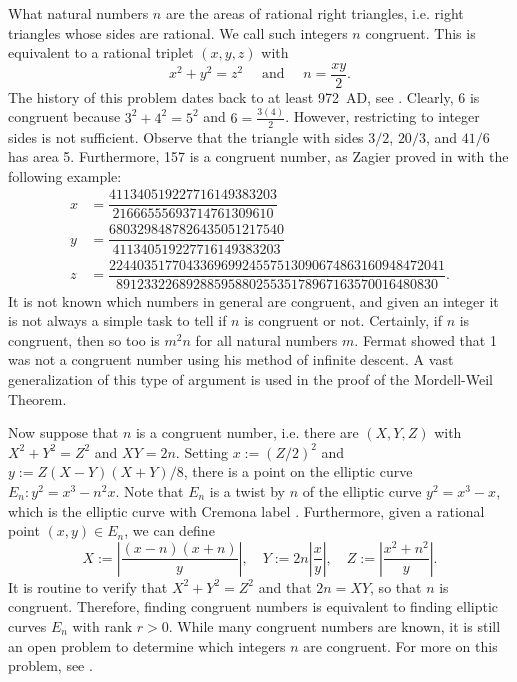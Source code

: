 \begin{ex}
What natural numbers $n$ are the areas of rational right triangles, i.e. right triangles whose sides are rational. We call such integers $n$ congruent. This is equivalent to a rational triplet $(x,y,z)$ with
	\[
	x^2 + y^2= z^2 \quad \text{ and } \quad n= \dfrac{xy}{2}.
	\]
The history of this problem dates back to at least 972~AD, see \cite{dickson71}. Clearly, $6$ is congruent because $3^2 + 4^2= 5^2$ and $6= \frac{3(4)}{2}$. However, restricting to integer sides is not sufficient. Observe that the triangle with sides $3/2$, $20/3$, and $41/6$ has area 5. Furthermore, 157 is a congruent number, as Zagier proved in \cite{zagier90} with the following example:
	\[
	\begin{aligned}
	x&= \dfrac{411340519227716149383203}{21666555693714761309610} \\
	y&= \dfrac{6803298487826435051217540}{411340519227716149383203} \\
	z&= \dfrac{224403517704336969924557513090674863160948472041}{8912332268928859588025535178967163570016480830}.
	\end{aligned}
	\]
It is not known which numbers in general are congruent, and given an integer it is not always a simple task to tell if $n$ is congruent or not. Certainly, if $n$ is congruent, then so too is $m^2n$ for all natural numbers $m$. Fermat showed that 1 was not a congruent number using his method of infinite descent. A vast generalization of this type of argument is used in the proof of the Mordell-Weil Theorem. 

Now suppose that $n$ is a congruent number, i.e. there are $(X,Y,Z)$ with $X^2 + Y^2= Z^2$ and $XY= 2n$. Setting $x:= (Z/2)^2$ and $y:= Z(X - Y)(X + Y)/8$, there is a point on the elliptic curve $E_n: y^2= x^3 - n^2x$. Note that $E_n$ is a twist by $n$ of the elliptic curve $y^2= x^3 - x$, which is the elliptic curve with Cremona label \ttat{}. Furthermore, given a rational point $(x,y) \in E_n$, we can define
	\[
	X:= \left| \dfrac{(x - n)(x + n)}{y} \right|, \quad Y:= 2n \left| \dfrac{x}{y} \right|, \quad Z:= \left| \dfrac{x^2 + n^2}{y} \right|.
	\]
It is routine to verify that $X^2 + Y^2= Z^2$ and that $2n= XY$, so that $n$ is congruent. Therefore, finding congruent numbers is equivalent to finding elliptic curves $E_n$ with rank $r > 0$. While many congruent numbers are known, it is still an open problem to determine which integers $n$ are congruent. For more on this problem, see \cite{koblitz93}.
\end{ex}


